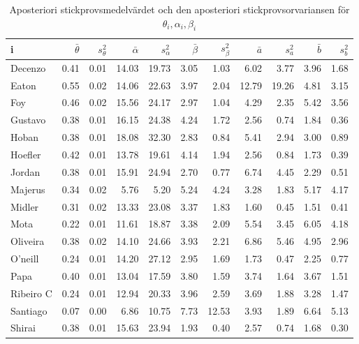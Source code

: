 \documentclass{article}
\begin{document}
\begin{table}[H]
    \centering
    \caption{Aposteriori stickprovsmedelvärdet och den aposteriori stickprovsorvariansen för $\theta_i, \alpha_i, \beta_i$}
    \label{tab:bayes_params}
    \begin{tabular}{l|rr|rr|rr|rr|rr}
        \toprule
        i & $\bar{\theta}$ & $s_{\theta}^2$ & $\bar{\alpha}$ & $s_{\alpha}^2$ & $\bar{\beta}$ & $s_{\beta}^2$ & $\bar{a}$ & $s_{a}^2$ & $\bar{b}$ & $s_{b}^2$ \\
        \midrule
        Decenzo & 0.41 & 0.01 & 14.03 & 19.73 & 3.05 & 1.03 & 6.02 & 3.77 & 3.96 & 1.68 \\
        Eaton & 0.55 & 0.02 & 14.06 & 22.63 & 3.97 & 2.04 & 12.79 & 19.26 & 4.81 & 3.15 \\
        Foy & 0.46 & 0.02 & 15.56 & 24.17 & 2.97 & 1.04 & 4.29 & 2.35 & 5.42 & 3.56 \\
        Gustavo & 0.38 & 0.01 & 16.15 & 24.38 & 4.24 & 1.72 & 2.56 & 0.74 & 1.84 & 0.36 \\
        Hoban & 0.38 & 0.01 & 18.08 & 32.30 & 2.83 & 0.84 & 5.41 & 2.94 & 3.00 & 0.89 \\
        Hoefler & 0.42 & 0.01 & 13.78 & 19.61 & 4.14 & 1.94 & 2.56 & 0.84 & 1.73 & 0.39 \\
        Jordan & 0.38 & 0.01 & 15.91 & 24.94 & 2.70 & 0.77 & 6.74 & 4.45 & 2.29 & 0.51 \\
        Majerus & 0.34 & 0.02 & 5.76 & 5.20 & 5.24 & 4.24 & 3.28 & 1.83 & 5.17 & 4.17 \\
        Midler & 0.31 & 0.02 & 13.33 & 23.08 & 3.37 & 1.83 & 1.60 & 0.45 & 1.51 & 0.41 \\
        Mota & 0.22 & 0.01 & 11.61 & 18.87 & 3.38 & 2.09 & 5.54 & 3.45 & 6.05 & 4.18 \\
        Oliveira & 0.38 & 0.02 & 14.10 & 24.66 & 3.93 & 2.21 & 6.86 & 5.46 & 4.95 & 2.96 \\
        O’neill & 0.24 & 0.01 & 14.20 & 27.12 & 2.95 & 1.69 & 1.73 & 0.47 & 2.25 & 0.77 \\
        Papa & 0.40 & 0.01 & 13.04 & 17.59 & 3.80 & 1.59 & 3.74 & 1.64 & 3.67 & 1.51 \\
        Ribeiro C & 0.24 & 0.01 & 12.94 & 20.33 & 3.96 & 2.59 & 3.69 & 1.88 & 3.28 & 1.47 \\
        Santiago & 0.07 & 0.00 & 6.86 & 10.75 & 7.73 & 12.53 & 3.93 & 1.89 & 6.64 & 5.13 \\
        Shirai & 0.38 & 0.01 & 15.63 & 23.94 & 1.93 & 0.40 & 2.57 & 0.74 & 1.68 & 0.30 \\
        \bottomrule
    \end{tabular}
\end{table}
\end{document}
